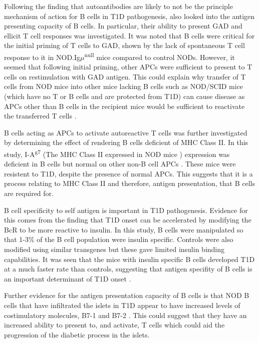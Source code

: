 Following the finding that autoantibodies are likely to not be the principle mechanism of action for B cells in T1D pathogenesis, \citet{Serreze1998} also looked into the antigen presenting capacity of B cells.
In particular, their ability to present GAD and ellicit T cell responses was investigated.
It was noted that B cells were critical for the initial priming of T cells to GAD, shown by the lack of spontaneous T cell response to it in NOD.Ig$\mu$\textsuperscript{null} mice compared to control NODs.
However, it seemed that following initial priming, other APCs were sufficient to present to T cells on restimulation with GAD antigen.
This could explain why transfer of T cells from NOD mice into other mice lacking B cells such as NOD/SCID mice (which have no T or B cells and are protected from T1D) can cause disease as APCs other than B cells in the recipient mice would be sufficient to reactivate the transferred T cells \citep{Charlton2001}.

B cells acting as APCs to activate autoreactive T cells was further investigated by determining the effect of rendering B cells deficient of MHC Class II.
In this study, I-A\textsuperscript{g7} (The MHC Class II expressed in NOD mice \citep{Stratmann2000}) expression was deficient in B cells but normal on other non-B cell APCs \citep{Noorchashm1999}.
These mice were resistent to T1D, despite the presence of normal APCs. 
This suggests that it is a process relating to MHC Class II and therefore, antigen presentation, that B cells are required for.


B cell specificity to self antigen is important in T1D pathogenesis.
Evidence for this comes from the finding that T1D onset can be accelerated by modifying the BcR to be more reactive to insulin.
In this study, B cells were manipulated so that 1-3\% of the B cell population were insulin specific.
Controls were also modified using similar transgenes but these gave limited insulin binding capabilities.
It was seen that the mice with insulin specific B cells developed T1D at a much faster rate than controls, suggesting that antigen specifity of B cells is an important determinant of T1D onset \citep{Hulbert2001}.

Further evidence for the antigen presentation capacity of B cells is that NOD B cells that have infiltrated the islets in T1D appear to have increased levels of costimulatory molecules, B7-1 and B7-2 \citep{Hussain2005}. 
This could suggest that they have an increased ability to present to, and activate, T cells which could aid the progression of the diabetic process in the islets.

